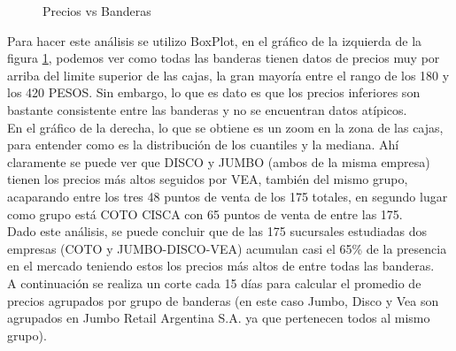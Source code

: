 \begin{figure}[h]
\centering
{}%
\hspace{0.25cm}%
\caption{Precios vs Banderas}
\label{Precios_vs_Banderas}
\end{figure}


Para hacer este análisis se utilizo BoxPlot, en el gráfico de la izquierda de la figura \ref{Precios_vs_Banderas}, podemos ver como todas las banderas tienen datos de precios muy por arriba del limite superior de las cajas, la gran mayoría entre el rango de los 180 y los 420 PESOS. Sin embargo, lo que es dato es que los precios inferiores son bastante consistente entre las banderas y no se encuentran datos atípicos.\\
En el gráfico de la derecha, lo que se obtiene es un zoom en la zona de las cajas, para entender como es la distribución de los cuantiles y la mediana. Ahí claramente se puede ver que DISCO y JUMBO (ambos de la misma empresa) tienen los precios más altos seguidos por VEA, también del mismo grupo, acaparando entre los tres 48 puntos de venta de los 175 totales, en segundo lugar como grupo está COTO CISCA con 65 puntos de venta de entre las 175.\\
Dado este análisis, se puede concluir que de las 175 sucursales estudiadas dos empresas (COTO y JUMBO-DISCO-VEA) acumulan casi el 65\% de la presencia en el mercado teniendo estos los precios más altos de entre todas las banderas.\\
\newpage
A continuación se realiza un corte cada 15 días para calcular el promedio de precios agrupados por grupo de banderas (en este caso Jumbo, Disco y Vea son agrupados en Jumbo Retail Argentina S.A. ya que pertenecen todos al mismo grupo).

